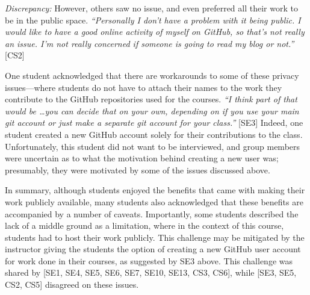 
\emph{Discrepancy:} However, others saw no issue, and even preferred all their work to be in the public space. \textit{``Personally I don't have a problem with it being public. I would like to have a good online activity of myself on GitHub, so that's not really an issue. I'm not really concerned if someone is going to read my blog or not.''} [CS2]

One student acknowledged that there are workarounds to some of these privacy issues---where students do not have to attach their names to the work they contribute to the GitHub repositories used for the courses. \textit{``I think part of that would be \ldots you can decide that on your own, depending on if you use your main git account or just make a separate git account for your class.''} [SE3] Indeed, one student created a new GitHub account solely for their contributions to the class. Unfortunately, this student did not want to be interviewed, and group members were uncertain as to what the motivation behind creating a new user was; presumably, they were motivated by some of the issues discussed above.

In summary, although students enjoyed the benefits that came with making their work publicly available, many students also acknowledged that these benefits are accompanied by a number of caveats. Importantly, some students described the lack of a middle ground as a limitation, where in the context of this course, students had to host their work publicly. This challenge may be mitigated by the instructor giving the students the option of creating a new GitHub user account for work done in their courses, as suggested by SE3 above. This challenge was shared by [SE1, SE4, SE5, SE6, SE7, SE10, SE13, CS3, CS6], while [SE3, SE5, CS2, CS5] disagreed on these issues. \\


